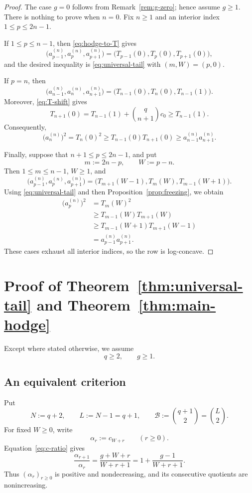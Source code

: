 \documentclass[12pt]{amsart}
\newcommand{\Bc}{\mathcal{B}}
\theoremstyle{plain}
\theoremstyle{definition}
\theoremstyle{remark}
\begin{document}
\begin{proof}
The case \(g=0\) follows from Remark~\ref{rem:g-zero}; hence assume
\(g\ge1\).  There is nothing to prove when \(n=0\).  Fix \(n\ge1\) and
an interior index \(1\le p\le2n-1\).

If \(1\le p\le n-1\), then \eqref{eq:hodge-to-T} gives
\[
 \bigl(a_{p-1}^{(n)},a_p^{(n)},a_{p+1}^{(n)}\bigr)
 =\bigl(T_{p-1}(0),T_p(0),T_{p+1}(0)\bigr),
\]
and the desired inequality is \eqref{eq:universal-tail} with
\((m,W)=(p,0)\).

If \(p=n\), then
\[
 \bigl(a_{n-1}^{(n)},a_n^{(n)},a_{n+1}^{(n)}\bigr)
 =\bigl(T_{n-1}(0),T_n(0),T_{n-1}(1)\bigr).
\]
Moreover, \eqref{eq:T-shift} gives
\[
 T_{n+1}(0)
 =T_{n-1}(1)+\binom q{n+1}c_0
 \ge T_{n-1}(1).
\]
Consequently,
\[
 \bigl(a_n^{(n)}\bigr)^2
 =T_n(0)^2
 \ge T_{n-1}(0)T_{n+1}(0)
 \ge a_{n-1}^{(n)}a_{n+1}^{(n)}.
\]

Finally, suppose that \(n+1\le p\le2n-1\), and put
\[
 m:=2n-p,
 \qquad
 W:=p-n.
\]
Then \(1\le m\le n-1\), \(W\ge1\), and
\[
 \bigl(a_{p-1}^{(n)},a_p^{(n)},a_{p+1}^{(n)}\bigr)
 =\bigl(T_{m+1}(W-1),T_m(W),T_{m-1}(W+1)\bigr).
\]
Using \eqref{eq:universal-tail} and then
Proposition~\ref{prop:freezing}, we obtain
\begin{align*}
 \bigl(a_p^{(n)}\bigr)^2
 &=T_m(W)^2\\
 &\ge T_{m-1}(W)T_{m+1}(W)\\
 &\ge T_{m-1}(W+1)T_{m+1}(W-1)\\
 &=a_{p-1}^{(n)}a_{p+1}^{(n)}.
\end{align*}
These cases exhaust all interior indices, so the row is log-concave.
\end{proof}

\section{Proof of Theorem~\ref{thm:universal-tail} and
Theorem~\ref{thm:main-hodge}}
\label{sec:tail-proof}

Except where stated otherwise, we assume
\begin{equation}\label{eq:tail-standing-assumptions}
 q\ge2,\qquad g\ge1.
\end{equation}

\subsection{An equivalent criterion}

Put
\[
 N:=q+2,\qquad
 L:=N-1=q+1,\qquad
 \Bc:=\binom{q+1}{2}=\binom L2.
\]
For fixed \(W\ge0\), write
\[
 \alpha_r:=c_{W+r}\qquad(r\ge0).
\]
Equation~\eqref{eq:c-ratio} gives
\begin{equation}\label{eq:alpha-ratio}
 \frac{\alpha_{r+1}}{\alpha_r}
 =\frac{g+W+r}{W+r+1}
 =1+\frac{g-1}{W+r+1}.
\end{equation}
Thus \((\alpha_r)_{r\ge0}\) is positive and nondecreasing, and its
consecutive quotients are nonincreasing.
\end{document}
